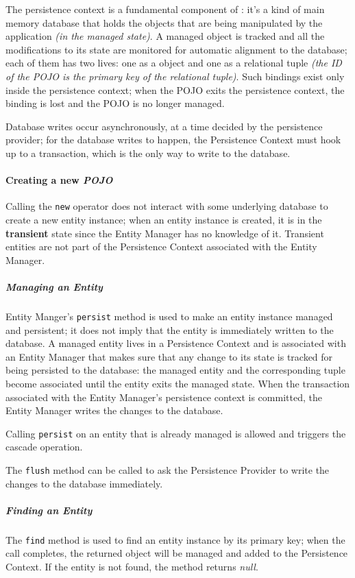 \documentclass[english]{article}
\begin{document}
The persistence context is a fundamental component of \jpa:
it's a kind of main memory database that holds the objects that are being manipulated by the application \textit{(in the managed state)}.
A managed object is tracked and all the modifications to its state are monitored for automatic alignment to the database;
each of them has two lives: one as a \java object and one as a relational tuple \textit{(the ID of the POJO is the primary key of the relational tuple)}.
Such bindings exist only inside the persistence context;
when the POJO exits the persistence context, the binding is lost and the POJO is no longer managed.

Database writes occur asynchronously, at a time decided by the persistence provider;
for the database writes to happen, the Persistence Context must hook up to a transaction, which is the only way to write to the database.

\paragraph{Creating a new \textit{POJO}}

Calling the \texttt{new} operator does not interact with some underlying database to create a new entity instance;
when an entity instance is created, it is in the \textbf{transient} state since the Entity Manager has no knowledge of it.
Transient entities are not part of the Persistence Context associated with the Entity Manager.

\subparagraph*{Managing an Entity}
Entity Manger's \texttt{persist} method is used to make an entity instance managed and persistent; it does not imply that the entity is immediately written to the database.
A managed entity lives in a Persistence Context and is associated with an Entity Manager that makes sure that any change to its state is tracked for being persisted to the database:
the managed entity and the corresponding tuple become associated until the entity exits the managed state.
When the transaction associated with the Entity Manager's persistence context is committed, the Entity Manager writes the changes to the database.

Calling \texttt{persist} on an entity that is already managed is allowed and triggers the cascade operation.

The \texttt{flush} method can be called to ask the Persistence Provider to write the changes to the database immediately.

\subparagraph*{Finding an Entity}
The \texttt{find} method is used to find an entity instance by its primary key;
when the call completes, the returned object will be managed and added to the Persistence Context.
If the entity is not found, the method returns \textit{null}.
\end{document}
